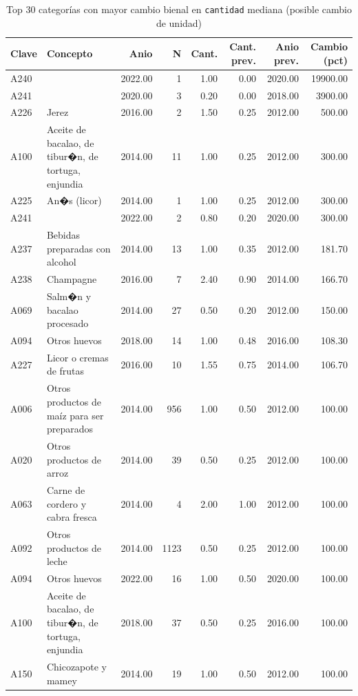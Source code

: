 \begin{table}[ht]
\centering
\caption{Top 30 categor\'ias con mayor cambio bienal en \texttt{cantidad} mediana (posible cambio de unidad)} 
\label{tab:23_cambio_cantidad_mediana_bienal}
\begin{tabular}{llrrrrrr}
  \toprule
Clave & Concepto & Anio & N & Cant. & Cant. prev. & Anio prev. & Cambio (pct) \\ 
  \midrule
A240 &  & 2022.00 &   1 & 1.00 & 0.00 & 2020.00 & 19900.00 \\ 
  A241 &  & 2020.00 &   3 & 0.20 & 0.00 & 2018.00 & 3900.00 \\ 
  A226 & Jerez & 2016.00 &   2 & 1.50 & 0.25 & 2012.00 & 500.00 \\ 
  A100 & Aceite de bacalao, de tibur�n, de tortuga, enjundia & 2014.00 &  11 & 1.00 & 0.25 & 2012.00 & 300.00 \\ 
  A225 & An�s (licor) & 2014.00 &   1 & 1.00 & 0.25 & 2012.00 & 300.00 \\ 
  A241 &  & 2022.00 &   2 & 0.80 & 0.20 & 2020.00 & 300.00 \\ 
  A237 & Bebidas preparadas con alcohol & 2014.00 &  13 & 1.00 & 0.35 & 2012.00 & 181.70 \\ 
  A238 & Champagne & 2016.00 &   7 & 2.40 & 0.90 & 2014.00 & 166.70 \\ 
  A069 & Salm�n y bacalao procesado & 2014.00 &  27 & 0.50 & 0.20 & 2012.00 & 150.00 \\ 
  A094 & Otros huevos & 2018.00 &  14 & 1.00 & 0.48 & 2016.00 & 108.30 \\ 
  A227 & Licor o cremas de frutas & 2016.00 &  10 & 1.55 & 0.75 & 2014.00 & 106.70 \\ 
  A006 & Otros productos de maíz para ser preparados & 2014.00 & 956 & 1.00 & 0.50 & 2012.00 & 100.00 \\ 
  A020 & Otros productos de arroz & 2014.00 &  39 & 0.50 & 0.25 & 2012.00 & 100.00 \\ 
  A063 & Carne de cordero y cabra fresca & 2014.00 &   4 & 2.00 & 1.00 & 2012.00 & 100.00 \\ 
  A092 & Otros productos de leche & 2014.00 & 1123 & 0.50 & 0.25 & 2012.00 & 100.00 \\ 
  A094 & Otros huevos & 2022.00 &  16 & 1.00 & 0.50 & 2020.00 & 100.00 \\ 
  A100 & Aceite de bacalao, de tibur�n, de tortuga, enjundia & 2018.00 &  37 & 0.50 & 0.25 & 2016.00 & 100.00 \\ 
  A150 & Chicozapote y mamey & 2014.00 &  19 & 1.00 & 0.50 & 2012.00 & 100.00 \\ 

\end{tabular}
\end{table}
